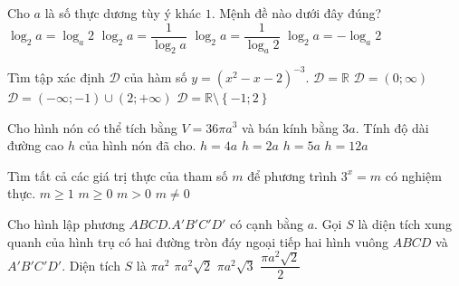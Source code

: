 \begin{ex}%
Cho $a$ là số thực dương tùy ý khác $ 1 $. Mệnh đề nào dưới đây đúng?
\choice
{$\log_{2}a=\log_{a}2$}
{$\log_{2}a=\dfrac{1}{\log_{2}a}$}
{\True $\log_{2}a=\dfrac{1}{\log_{a}2}$}
{$\log_{2}a=-\log_{a}2$}
\end{ex}

\begin{ex}%
Tìm tập xác định $\mathscr{D}$ của hàm số $y=\left(x^2-x-2\right)^{-3}$.
\choice
{ $\mathscr{D}=\mathbb{R}$}
{ $\mathscr{D}=\left(0;\infty\right)$}
{$\mathscr{D}=\left(-\infty;-1\right)\cup \left(2;+\infty\right)$}
{ \True  $\mathscr{D}=\mathbb{R}\setminus \left\{-1;2\right\}$}
\end{ex}

\begin{ex}%
Cho hình nón có thể tích bằng $V = 36 \pi a^3$ và bán kính bằng $3a$. Tính độ dài đường cao $h$ của hình nón đã cho.
\choice
{$h=4a$}
{$h=2a$}
{$h=5a$}
{\True $h=12a$}
\end{ex}

\begin{ex}%
Tìm tất cả các giá trị thực của tham số $m$ để phương trình $3^x = m$ có nghiệm thực.
\choice
{$m \ge 1$}
{$m \ge 0$}
{\True $m > 0$}
{$m \ne 0$}
\end{ex}


\begin{ex}%
Cho hình lập phương $ABCD.A'B'C'D'$ có cạnh bằng $a$. Gọi $S$ là diện tích xung quanh của hình trụ có hai đường tròn đáy ngoại tiếp hai hình vuông $ABCD$ và $A'B'C'D'$. Diện tích $S$ là
\choice
{$\pi a^2$}
{\True $\pi a^2 \sqrt{2}$}
{$\pi a^2 \sqrt{3}$}
{$\dfrac{\pi a^2 \sqrt{2}}{2}$}
\end{ex}

